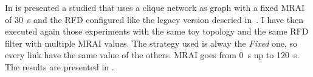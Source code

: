 %	

%
%	
%
%
%

In  is presented a studied that uses a clique
network as graph with a fixed \ac{MRAI} of \SI{30}{\second} and the \ac{RFD}
configured like the legacy version descried in~\cite{rfc2439}.
I have then executed again those experiments with the same toy topology and the
same \ac{RFD} filter with multiple \ac{MRAI} values.
The strategy used is alway the \textit{Fixed} one, so every link have the same
value of the others.
\ac{MRAI} goes from \SI{0}{\second} up to \SI{120}{\second}.
The results are presented in .

